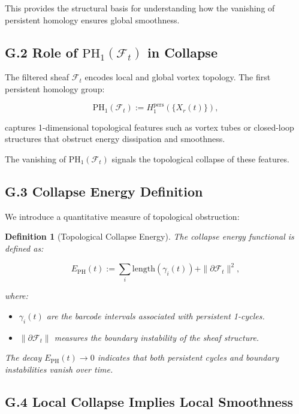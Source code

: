\documentclass[11pt]{article}
\newtheorem{definition}[theorem]{Definition}
\begin{document}
This provides the structural basis for understanding how the vanishing of persistent homology ensures global smoothness.

\subsection*{G.2 Role of \( \mathrm{PH}_1(\mathcal{F}_t) \) in Collapse}

The filtered sheaf \( \mathcal{F}_t \) encodes local and global vortex topology. The first persistent homology group:

\[
\mathrm{PH}_1(\mathcal{F}_t) := H_1^{\mathrm{pers}} \left( \{ X_r(t) \} \right),
\]

captures 1-dimensional topological features such as vortex tubes or closed-loop structures that obstruct energy dissipation and smoothness.

The vanishing of \( \mathrm{PH}_1(\mathcal{F}_t) \) signals the topological collapse of these features.

\subsection*{G.3 Collapse Energy Definition}

We introduce a quantitative measure of topological obstruction:

\begin{definition}[Topological Collapse Energy]
The collapse energy functional is defined as:

\[
E_{\mathrm{PH}}(t) := \sum_{i} \mathrm{length}(\gamma_i(t)) + \| \partial \mathcal{F}_t \|^2,
\]

where:

\begin{itemize}
  \item \( \gamma_i(t) \) are the barcode intervals associated with persistent 1-cycles.
  \item \( \| \partial \mathcal{F}_t \| \) measures the boundary instability of the sheaf structure.
\end{itemize}

The decay \( E_{\mathrm{PH}}(t) \to 0 \) indicates that both persistent cycles and boundary instabilities vanish over time.
\end{definition}

\subsection*{G.4 Local Collapse Implies Local Smoothness}
\end{document}

